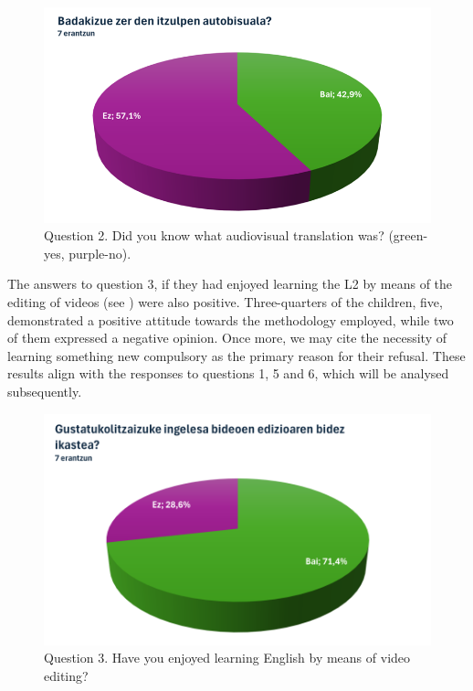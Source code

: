 \begin{figure}[!htbp]
    \centering
    \begin{minipage}{.6\textwidth}
    \includegraphics[width=\textwidth]{fig02.png}
    \caption{Question 2. Did you know what audiovisual translation
    was? (green-yes, purple-no).}
    \label{fig-02}
    \end{minipage}
\end{figure}

The answers to question 3, if they had enjoyed learning the L2 by means
of the editing of videos (see ) were also positive.
Three-quarters of the children, five, demonstrated a positive attitude
towards the methodology employed, while two of them expressed a negative
opinion. Once more, we may cite the necessity of learning something new
compulsory as the primary reason for their refusal. These results align
with the responses to questions 1, 5 and 6, which will be analysed
subsequently.

\begin{figure}[!htbp]
    \centering
    \begin{minipage}{.6\textwidth}
    \includegraphics[width=\textwidth]{fig03.png}
    \caption{Question 3. Have you enjoyed learning English by
    means of video editing?}
    \label{fig-03}
    \end{minipage}
\end{figure}

